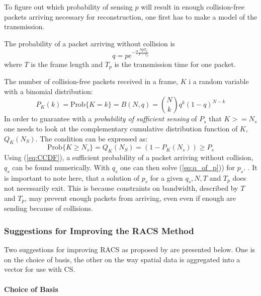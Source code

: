 \documentclass[Main]{subfiles}
\begin{document}
			To figure out which probability of sensing $p$ will result in enough collision-free packets arriving necessary for reconstruction, one first has to make a model of the transmission.

			The probability of a packet arriving without collision is
			\begin{equation}
				q = pe^{-2\frac{NpT_p}{T-T_p}}
				\label{eq:q_of_p} 
			\end{equation}
			where $T$ is the frame length and $T_p$ is the transmission time for one packet.

			The number of collision-free packets received in a frame, $K$ i a random variable with a binomial distribution:
			\begin{equation}
				P_K(k) = \text{Prob}\{K=k\} = B(N,q) =
					\binom{N}{k} q^k(1-q)^{N-k}
			\end{equation}
			In order to guarantee with a \emph{probability of sufficient sensing} of $P_s$ that $K >= N_s$ one needs to look at the complementary cumulative distribution function of $K$, $Q_K(N_S)$.
			The condition can be expressed as:
			\begin{equation}
				\text{Prob}\{K \geq N_s\} = Q_K(N_S) = (1-P_K(N_s)) \geq P_s
				\label{eq:CCDF} 
			\end{equation}
			Using (\ref{eq:CCDF}), a sufficient probability of a packet arriving without collision, $q_s$ can be found numerically.
			With $q_s$ one can then solve (\ref{eq:q_of_p})) for $p_s$.
			.
			It is important to note here, that a solution of $p_s$ for a given $q_s, N, T$ and $T_p$ does not necessarily exit.
			This is because constraints on bandwidth, described by $T$ and $T_p$, may prevent enough packets from arriving, even even if enough are sending because of collisions.



		\subsubsection{Suggestions for Improving the RACS Method} %
		\label{sub:suggestions_for_improving_the_racs_method}

			Two suggestions for improving RACS as proposed by \cite{Fazel2011} are presented below.
			One is on the choice of basis, the other on the way spatial data is aggregated into a vector for use with CS.

			\paragraph{Choice of Basis} %
			\label{par:choice_of_basis}
			
\end{document}
